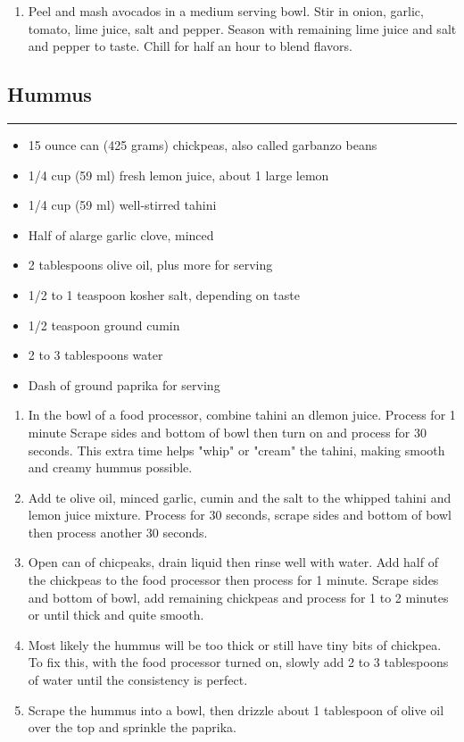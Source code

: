 \documentclass{article}
\begin{document}
\begin{enumerate}
    \item 
        Peel and mash avocados in a medium serving bowl. Stir in onion, garlic, tomato, lime juice, salt and pepper. Season with remaining lime juice and salt and pepper to taste. Chill for half an hour to blend flavors.
\end{enumerate}
\newpage

\subsection{Hummus} 
\noindent\rule[0.5ex]{\linewidth}{1pt}

\begin{framed}
    \begin{itemize}
        \item 15 ounce can (425 grams) chickpeas, also called garbanzo beans
        \item 1/4 cup (59 ml) fresh lemon juice, about 1 large lemon
        \item 1/4 cup (59 ml) well-stirred tahini
        \item Half of alarge garlic clove, minced
        \item 2 tablespoons olive oil, plus more for serving
        \item 1/2 to 1 teaspoon kosher salt, depending on taste
        \item 1/2 teaspoon ground cumin
        \item 2 to 3 tablespoons water
        \item Dash of ground paprika for serving
    \end{itemize}
\end{framed}

\begin{enumerate}
    \item 
        In the bowl of a food processor, combine tahini an dlemon juice. Process for 1 minute Scrape sides and bottom of bowl then turn on and process for 30 seconds. This extra time helps "whip" or "cream" the tahini, making smooth and creamy hummus possible.
    \item 
        Add te olive oil, minced garlic, cumin and the salt to the whipped tahini and lemon juice mixture. Process for 30 seconds, scrape sides and bottom of bowl then process another 30 seconds.
    \item 
        Open can of chicpeaks, drain liquid then rinse well with water. Add half of the chickpeas to the food processor then process for 1 minute. Scrape sides and bottom of bowl, add remaining chickpeas and process for 1 to 2 minutes or until thick and quite smooth.
    \item 
        Most likely the hummus will be too thick or still have tiny bits of chickpea. To fix this, with the food processor turned on, slowly add 2 to 3 tablespoons of water until the consistency is perfect.
    \item 
        Scrape the hummus into a bowl, then drizzle about 1 tablespoon of olive oil over the top and sprinkle the paprika.
\end{enumerate}
\end{document}

